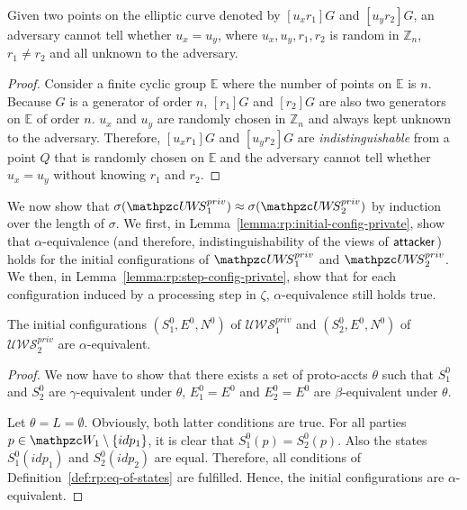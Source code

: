   \begin{lemma}\label{thm-rp-unlinkability}
    Given two points on the elliptic curve denoted by $[u_xr_1]G$ and $[u_yr_2]G$, 
    an adversary cannot tell whether $u_x=u_y$, where $u_x, u_y, r_1, r_2$ is random in $\mathbb{Z}_n$, $r_1\neq r_2$ and all unknown to the adversary.
  \end{lemma}
  \begin{proof}
    Consider a finite cyclic group $\mathbb{E}$ where the number of points on $\mathbb{E}$ is $n$. 
    Because $G$ is a generator of order $n$, $[r_1]G$ and $[r_2]G$ are also two generators on $\mathbb{E}$ of order $n$. 
    $u_x$ and $u_y$ are randomly chosen in $\mathbb{Z}_n$ and always kept unknown to the adversary. 
    Therefore, $[u_xr_1]G$ and $[u_yr_2]G$ are \emph{indistinguishable} from a point $Q$ that is randomly chosen on $\mathbb{E}$ \cite{oprf-proved,voprf-proved} 
    and the adversary cannot tell whether $u_x=u_y$ without knowing $r_1$ and $r_2$.
  \end{proof}
  
  We now show that $\sigma(\uppressoprivwebsystem_1) \approx
  \sigma(\uppressoprivwebsystem_2)$ by induction over the length 
  of $\sigma$. 
  We first, in Lemma~\ref{lemma:rp:initial-config-private}, 
  show that $\alpha$-equivalence (and therefore, 
  indistinguishability of the views of $\mathsf{attacker}$) holds 
  for the initial configurations of $\uppressoprivwebsystem_1$ 
  and $\uppressoprivwebsystem_2$. 
  We then, in Lemma~\ref{lemma:rp:step-config-private}, 
  show that for each configuration induced by a processing step 
  in $\zeta$, $\alpha$-equivalence still holds true.
  
  \begin{lemma}\label{lemma:rp:initial-config-private}
    The initial configurations $(S_1^0,E^0,N^0)$ of 
    $\mathcal{U\!W\!S}^{priv}_1$ and $(S_2^0,E^0,N^0)$ of 
    $\mathcal{U\!W\!S}^{priv}_2$ are $\alpha$-equivalent.
  \end{lemma}
  \begin{proof}
    We now have to show that there exists a set of proto-accts 
    $\theta$ such that $S_1^0$ and $S_2^0$ are 
    $\gamma$-equivalent under $\theta$, $E_1^0 = E^0$ and 
    $E_2^0 = E^0$ are $\beta$-equivalent under $\theta$.
  
    Let $\theta=L=\emptyset$. Obviously, both latter conditions 
    are true. For all parties $p \in \bidsystem_1 \setminus \{idp_1\}$, 
    it is clear that $S_1^0(p) = S_2^0(p)$. Also the states 
    $S_1^0(idp_1)$ and $S_2^0(idp_2)$ are equal. Therefore, 
    all conditions of Definition~\ref{def:rp:eq-of-states} are 
    fulfilled. Hence, the initial configurations are 
    $\alpha$-equivalent.
  \end{proof}
  
